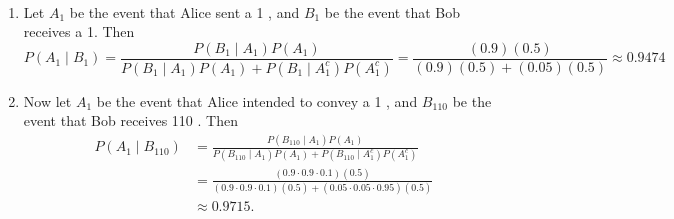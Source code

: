 

\setcounter{theorem}{7}

\begin{exercise}[BH.2.11]
	\begin{solution}~
		\begin{enumerate}
			\item Let $A_1$ be the event that Alice sent a 1 , and $B_1$ be the event that Bob receives a 1. Then
			$$
			P\left(A_1 \mid B_1\right)=\frac{P\left(B_1 \mid A_1\right) P\left(A_1\right)}{P\left(B_1 \mid A_1\right) P\left(A_1\right)+P\left(B_1 \mid A_1^c\right) P\left(A_1^c\right)}=\frac{(0.9)(0.5)}{(0.9)(0.5)+(0.05)(0.5)} \approx 0.9474
			$$
			\item Now let $A_1$ be the event that Alice intended to convey a 1 , and $B_{110}$ be the event that Bob receives 110 . Then
			$$
			\begin{aligned}
				P\left(A_1 \mid B_{110}\right) &=\frac{P\left(B_{110} \mid A_1\right) P\left(A_1\right)}{P\left(B_{110} \mid A_1\right) P\left(A_1\right)+P\left(B_{110} \mid A_1^c\right) P\left(A_1^c\right)} \\
				&=\frac{(0.9 \cdot 0.9 \cdot 0.1)(0.5)}{(0.9 \cdot 0.9 \cdot 0.1)(0.5)+(0.05 \cdot 0.05 \cdot 0.95)(0.5)} \\
				& \approx 0.9715 .
			\end{aligned}
			$$
		\end{enumerate}
	\end{solution}
\end{exercise}



